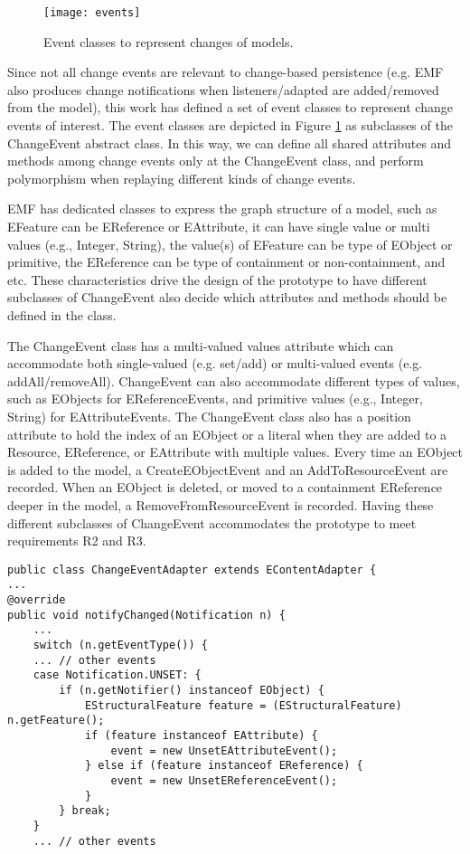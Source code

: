 \begin{figure}[th]
    \centering
    \texttt{[image: events]}
    \caption{Event classes to represent changes of models.}
    \label{fig:events}
\end{figure}

Since not all change events are relevant to change-based persistence (e.g. EMF also produces change notifications when listeners/adapted are added/removed from the model), this work has defined a set of event classes to represent change events of interest. The event classes are depicted in Figure \ref{fig:events} as subclasses of the \textsf{ChangeEvent} abstract class. In this way, we can define all shared attributes and methods among change events  only at the \textsf{ChangeEvent} class, and perform polymorphism when replaying different kinds of change events.

EMF has dedicated classes to express the graph structure of a model, such as \textsf{EFeature} can be \textsf{EReference} or \textsf{EAttribute}, it can have single value or multi values (e.g., Integer, String), the value(s) of \textsf{EFeature} can be type of \textsf{EObject} or primitive, the \textsf{EReference} can be type of containment or non-containment, and etc. These characteristics drive the design of the prototype to have different subclasses of \textsf{ChangeEvent} also decide which attributes and methods should be defined in the class. 

The \textsf{ChangeEvent} class has a multi-valued \textsf{values} attribute which can accommodate both single-valued (e.g. set/add) or multi-valued events (e.g. addAll/removeAll). \textsf{ChangeEvent} can also accommodate different types of values, such as \textsf{EObject}s for \textsf{EReferenceEvents}, and primitive values (e.g., Integer, String) for \textsf{EAttributeEvents}. The \textsf{ChangeEvent} class also has a position attribute to hold the index of an \textsf{EObject} or a literal when they are added to a \textsf{Resource}, \textsf{EReference}, or \textsf{EAttribute} with multiple values. Every time an \textsf{EObject} is added to the model, a \textsf{CreateEObjectEvent} and an \textsf{AddToResourceEvent} are recorded. When an EObject is deleted, or moved to a containment \textsf{EReference} deeper in the model, a \textsf{RemoveFromResourceEvent} is recorded. Having these different subclasses of \textsf{ChangeEvent} accommodates the prototype to meet requirements R2 and R3.
\begin{lstlisting}[style=java,caption={Simplified Java code to handle notification events.},label=lst:javacode]
public class ChangeEventAdapter extends EContentAdapter {
...
@override
public void notifyChanged(Notification n) {
    ...
    switch (n.getEventType()) {
    ... // other events
    case Notification.UNSET: {
        if (n.getNotifier() instanceof EObject) {
            EStructuralFeature feature = (EStructuralFeature) n.getFeature();
            if (feature instanceof EAttribute) {
                event = new UnsetEAttributeEvent();
            } else if (feature instanceof EReference) {
                event = new UnsetEReferenceEvent();
            }
        } break;
    } 
    ... // other events
\end{lstlisting}	

